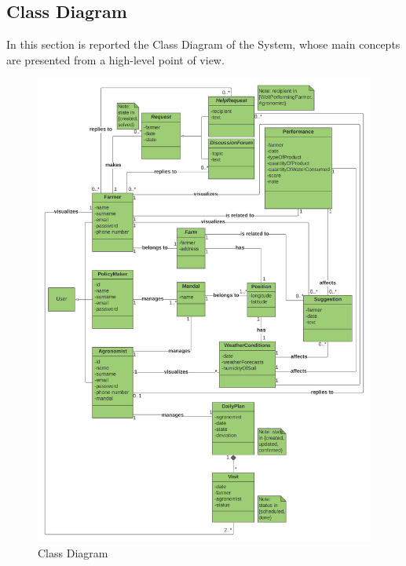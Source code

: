 \subsection{Class Diagram}
In this section is reported the Class Diagram of the System, whose main concepts are presented from a high-level point of view. 
\begin{figure}[H]
  \includegraphics[width=125.5mm,scale=0.9]{./Images/Class Diagram DREAM.png}
  \caption{Class Diagram}
\end{figure}





\newpage


